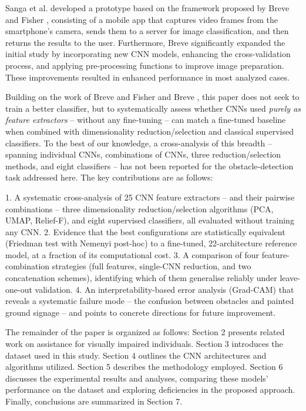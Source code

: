 \documentclass[preprint,12pt]{elsarticle}
\begin{document}
Sanga et al. \cite{sanga2023} developed a prototype based on the framework proposed by Breve and Fisher \cite{breve2020}, consisting of a mobile app that captures video frames from the smartphone's camera, sends them to a server for image classification, and then returns the results to the user. Furthermore, Breve \cite{breve2023} significantly expanded the initial study by incorporating new CNN models, enhancing the cross-validation process, and applying pre-processing functions to improve image preparation. These improvements resulted in enhanced performance in most analyzed cases.

Building on the work of Breve and Fisher \cite{breve2020} and Breve \cite{breve2023}, this paper does not seek to train a better classifier, but to systematically assess whether CNNs used \emph{purely as feature extractors} -- without any fine-tuning -- can match a fine-tuned baseline when combined with dimensionality reduction/selection and classical supervised classifiers. To the best of our knowledge, a cross-analysis of this breadth -- spanning individual CNNs, combinations of CNNs, three reduction/selection methods, and eight classifiers -- has not been reported for the obstacle-detection task addressed here. The key contributions are as follows:

1. A systematic cross-analysis of 25 CNN feature extractors -- and their pairwise combinations -- three dimensionality reduction/selection algorithms (PCA, UMAP, Relief-F), and eight supervised classifiers, all evaluated without training any CNN.
2. Evidence that the best configurations are statistically equivalent (Friedman test with Nemenyi post-hoc) to a fine-tuned, 22-architecture reference model, at a fraction of its computational cost.
3. A comparison of four feature-combination strategies (full features, single-CNN reduction, and two concatenation schemes), identifying which of them generalise reliably under leave-one-out validation.
4. An interpretability-based error analysis (Grad-CAM) that reveals a systematic failure mode -- the confusion between obstacles and painted ground signage -- and points to concrete directions for future improvement.

The remainder of the paper is organized as follows: Section 2 presents related work on assistance for visually impaired individuals. Section 3 introduces the dataset used in this study. Section 4 outlines the CNN architectures and algorithms utilized. Section 5 describes the methodology employed. Section 6 discusses the experimental results and analyses, comparing these models' performance on the dataset and exploring deficiencies in the proposed approach. Finally, conclusions are summarized in Section 7. 
\end{document}
